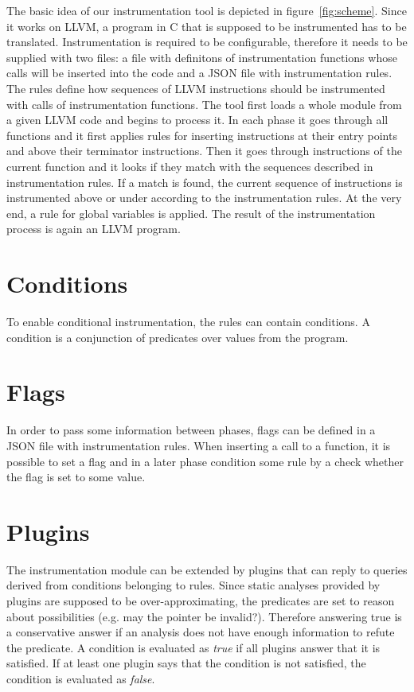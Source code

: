 The basic idea of our instrumentation tool is depicted in
figure~\ref{fig:scheme}. Since it works on LLVM, a program in C that is
supposed to be instrumented has to be translated. Instrumentation is required
to be configurable, therefore it needs to be supplied with two files: a file
with definitons of instrumentation functions whose calls will be inserted into
the code and a JSON file with instrumentation rules. The rules define how
sequences of LLVM instructions should be instrumented with calls of
instrumentation functions. The tool first loads a whole module from a given
LLVM code and begins to process it. In each phase it goes through all functions
and it first applies rules for inserting instructions at their entry points and
above their terminator instructions. Then it goes through instructions of the
current function and it looks if they match with the sequences described in
instrumentation rules. If a match is found, the current sequence of
instructions is instrumented above or under according to the instrumentation
rules. At the very end, a rule for global variables is applied. The result of
the instrumentation process is again an LLVM program.

\section{Conditions}\label{sec:conditions}

To enable conditional instrumentation, the rules can contain conditions. A
condition is a conjunction of predicates over values from the program.

\section{Flags}
In order to pass some information between phases, flags can be defined in a
JSON file with instrumentation rules. When inserting a call to a function, it
is possible to set a flag and in a later phase condition some rule by a check
whether the flag is set to some value.

\section{Plugins}

The instrumentation module can be extended by plugins that can reply to queries
derived from conditions belonging to rules. Since static analyses provided by
plugins are supposed to be over-approximating, the predicates are set to reason
about possibilities (e.g. may the pointer be invalid?). Therefore answering
true is a conservative answer if an analysis does not have enough information
to refute the predicate. A condition is evaluated as \emph{true} if all plugins
answer that it is satisfied. If at least one plugin says that the condition is
not satisfied, the condition is evaluated as \emph{false}.

